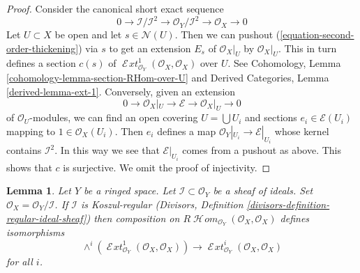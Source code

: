 \documentclass{stacks-project}
\theoremstyle{plain}
\newtheorem{lemma}[subsection]{Lemma}
\theoremstyle{definition}
\theoremstyle{remark}
\numberwithin{equation}{subsection}
\def\SheafHom{\mathop{\mathcal{H}\!\mathit{om}}\nolimits}
\def\SheafExt{\mathop{\mathcal{E}\!\mathit{xt}}\nolimits}
\begin{document}
\begin{proof}
Consider the canonical short exact sequence
\begin{equation}
\label{equation-second-order-thickening}
0 \to \mathcal{I}/\mathcal{I}^2 \to \mathcal{O}_Y/\mathcal{I}^2 \to
\mathcal{O}_X \to 0
\end{equation}
Let $U \subset X$ be open and let $s \in \mathcal{N}(U)$. Then we can
pushout (\ref{equation-second-order-thickening}) via $s$ to
get an extension $E_s$ of $\mathcal{O}_X|_U$ by $\mathcal{O}_X|_U$.
This in turn defines a section $c(s)$ of
$\SheafExt^1_{\mathcal{O}_Y}(\mathcal{O}_X, \mathcal{O}_X)$
over $U$.
See Cohomology, Lemma \ref{cohomology-lemma-section-RHom-over-U}
and Derived Categories, Lemma \ref{derived-lemma-ext-1}.
Conversely, given an extension
$$
0 \to \mathcal{O}_X|_U \to \mathcal{E} \to \mathcal{O}_X|_U \to 0
$$
of $\mathcal{O}_U$-modules, we can find an open covering
$U = \bigcup U_i$ and sections $e_i \in \mathcal{E}(U_i)$
mapping to $1 \in \mathcal{O}_X(U_i)$. Then $e_i$ defines a map
$\mathcal{O}_Y|_{U_i} \to \mathcal{E}|_{U_i}$ whose kernel
contains $\mathcal{I}^2$. In this way we see that
$\mathcal{E}|_{U_i}$ comes from a pushout as above.
This shows that $c$ is surjective. We omit the proof
of injectivity.
\end{proof}

\begin{lemma}
\label{lemma-regular-ideal-ext}
Let $Y$ be a ringed space. Let $\mathcal{I} \subset \mathcal{O}_Y$
be a sheaf of ideals. Set $\mathcal{O}_X = \mathcal{O}_Y/\mathcal{I}$.
If $\mathcal{I}$ is Koszul-regular
(Divisors, Definition \ref{divisors-definition-regular-ideal-sheaf})
then composition on $R\SheafHom_{\mathcal{O}_Y}(\mathcal{O}_X, \mathcal{O}_X)$
defines isomorphisms
$$
\wedge^i(\SheafExt^1_{\mathcal{O}_Y}(\mathcal{O}_X, \mathcal{O}_X))
\longrightarrow
\SheafExt^i_{\mathcal{O}_Y}(\mathcal{O}_X, \mathcal{O}_X)
$$
for all $i$.
\end{lemma}
\end{document}
